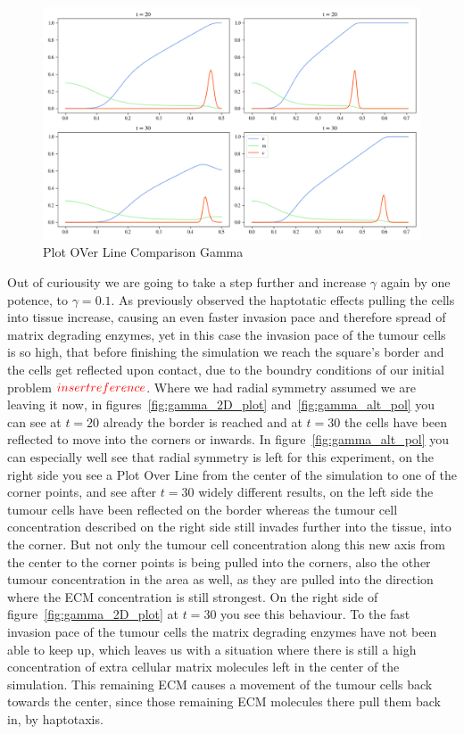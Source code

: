 \begin{figure}[h]
    \centering
    \includegraphics[width=\textwidth]{resources/images/pol_comparison.png}
    \caption{Plot OVer Line Comparison Gamma}
    \label{fig:gamma_pol_comparison}
\end{figure}
Out of curiousity we are going to take a step further and increase $\gamma$ again by one potence, to $\gamma=0.1$. As previously observed the haptotatic effects pulling the cells into tissue increase, causing an even faster invasion pace and therefore spread of matrix degrading enzymes, yet in this case the invasion pace of the tumour cells is so high, that before finishing the simulation we reach the square's border and the cells get reflected upon contact, due to the boundry conditions of our initial problem $\textcolor{red}{insertreference}$. Where we had radial symmetry assumed we are leaving it now, in figures~\ref{fig:gamma_2D_plot} and~\ref{fig:gamma_alt_pol} you can see at $t=20$ already the border is reached and at $t=30$ the cells have been reflected to move into the corners or inwards. In figure~\ref{fig:gamma_alt_pol} you can especially well see that radial symmetry is left for this experiment, on the right side you see a Plot Over Line from the center of the simulation to one of the corner points, and see after $t=30$ widely different results, on the left side the tumour cells have been reflected on the border whereas the tumour cell concentration described on the right side still invades further into the tissue, into the corner. But not only the tumour cell concentration along this new axis from the center to the corner points is being pulled into the corners, also the other tumour concentration in the area as well, as they are pulled into the direction where the ECM concentration is still strongest. On the right side of figure~\ref{fig:gamma_2D_plot} at $t=30$ you see this behaviour. To the fast invasion pace of the tumour cells the matrix degrading enzymes have not been able to keep up, which leaves us with a situation where there is still a high concentration of extra cellular matrix molecules left in the center of the simulation. This remaining ECM causes a movement of the tumour cells back towards the center, since those remaining ECM molecules there pull them back in, by haptotaxis.
